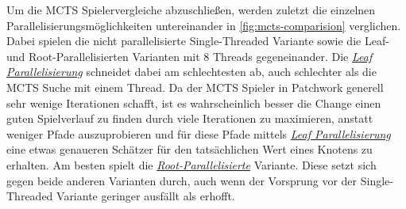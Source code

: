 \pagebreak

Um die \ac{MCTS} Spielervergleiche abzuschließen, werden zuletzt die einzelnen Parallelisierungsmöglichkeiten untereinander in \ref{fig:mcts-comparision} verglichen. Dabei spielen die nicht parallelisierte Single-Threaded Variante sowie die Leaf- und Root-Parallelisierten Varianten mit 8 Threads gegeneinander. Die \hyperref[text:leaf-parallelization]{\emph{Leaf Parallelisierung}} schneidet dabei am schlechtesten ab, auch schlechter als die \ac{MCTS} Suche mit einem Thread. Da der \ac{MCTS} Spieler in Patchwork generell sehr wenige Iterationen schafft, ist es wahrscheinlich besser die Change einen guten Spielverlauf zu finden durch viele Iterationen zu maximieren, anstatt weniger Pfade auszuprobieren und für diese Pfade mittels \hyperref[text:leaf-parallelization]{\emph{Leaf Parallelisierung}} eine etwas genaueren Schätzer für den tatsächlichen Wert eines Knotens zu erhalten. Am besten spielt die \hyperref[text:root-parallelization]{\emph{Root-Parallelisierte}} Variante. Diese setzt sich gegen beide anderen Varianten durch, auch wenn der Vorsprung vor der Single-Threaded Variante geringer ausfällt als erhofft.

